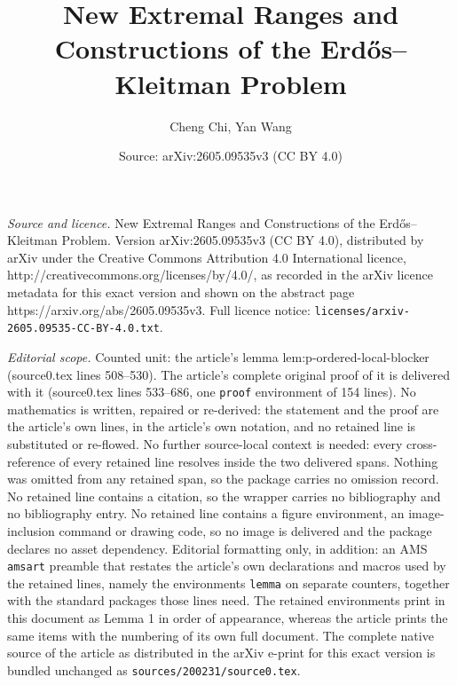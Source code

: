 \documentclass[10pt,a4paper]{amsart}
\title{New Extremal Ranges and Constructions of the Erd\H{o}s--Kleitman Problem}
\author{Cheng Chi, Yan Wang}
\date{Source: arXiv:2605.09535v3 (CC BY 4.0)}
\begin{document}
\maketitle

\noindent\emph{Source and licence.} New Extremal Ranges and Constructions of the Erd\H{o}s--Kleitman Problem. Version arXiv:2605.09535v3 (CC BY 4.0), distributed by arXiv under the Creative Commons Attribution 4.0 International licence, http://creativecommons.org/licenses/by/4.0/, as recorded in the arXiv licence metadata for this exact version and shown on the abstract page https://arxiv.org/abs/2605.09535v3. Full licence notice: \texttt{licenses/arxiv-2605.09535-CC-BY-4.0.txt}.\par\smallskip

\noindent\textit{Editorial scope.} Counted unit: the article's lemma lem:p-ordered-local-blocker (source0.tex lines 508--530). The article's complete original proof of it is delivered with it (source0.tex lines 533--686, one \texttt{proof} environment of 154 lines). No mathematics is written, repaired or re-derived: the statement and the proof are the article's own lines, in the article's own notation, and no retained line is substituted or re-flowed.  No further source-local context is needed: every cross-reference of every retained line resolves inside the two delivered spans.  Nothing was omitted from any retained span, so the package carries no omission record.  No retained line contains a citation, so the wrapper carries no bibliography and no bibliography entry.  No retained line contains a figure environment, an image-inclusion command or drawing code, so no image is delivered and the package declares no asset dependency.  Editorial formatting only, in addition: an AMS \texttt{amsart} preamble that restates the article's own declarations and macros used by the retained lines, namely the environments \texttt{lemma} on separate counters, together with the standard packages those lines need.  The retained environments print in this document as Lemma 1 in order of appearance, whereas the article prints the same items with the numbering of its own full document.  The complete native source of the article as distributed in the arXiv e-print for this exact version is bundled unchanged as \texttt{sources/200231/source0.tex}.
\end{document}
